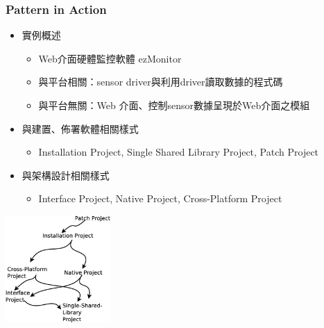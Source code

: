 \documentclass[utf8x]{beamer}
\begin{document}
\begin{frame}
\frametitle{Pattern in Action}
\begin{itemize}
\setlength{\itemindent}{1em}
\item[] 實例概述
\begin{itemize}
\item[] Web介面硬體監控軟體 ezMonitor
\item[] 與平台相關：sensor driver與利用driver讀取數據的程式碼%
\item[] 與平台無關：Web 介面、控制sensor數據呈現於Web介面之模組
\end{itemize}
\item[] 與建置、佈署軟體相關樣式
\begin{itemize}
\item[] Installation Project, Single Shared Library Project, Patch Project
\end{itemize}
\item[] 與架構設計相關樣式
\begin{itemize}
\item[] Interface Project, Native Project, Cross-Platform Project
\end{itemize}
\end{itemize}
\begin{center}
\includegraphics[width=4cm]{project-catgory-pattern-language-network.eps}
\end{center}
\end{frame}


\end{document}
